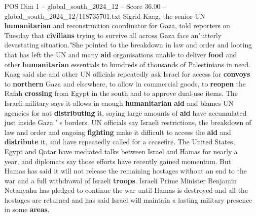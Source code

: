 \begin{textsample}{POS Dim 1 – global\_south\_2024\_12 – Score 36.00 – global\_south\_2024\_12/118735701.txt}
Sigrid Kaag, the senior UN \textbf{humanitarian} and reconstruction coordinator for Gaza, told reporters on Tuesday that \textbf{civilians} trying to survive all across Gaza face an"utterly devastating situation."She pointed to the breakdown in law and order and looting that has left the UN and many \textbf{aid} organisations unable to deliver \textbf{food} and other \textbf{humanitarian} essentials to hundreds of thousands of Palestinians in need.
Kaag said she and other UN officials repeatedly ask Israel for access for \textbf{convoys} to \textbf{northern} Gaza and elsewhere, to allow in commercial goods, to \textbf{reopen} the Rafah \textbf{crossing} from Egypt in the south and to approve dual-use items.
The Israeli military says it allows in enough \textbf{humanitarian} \textbf{aid} and blames UN agencies for not \textbf{distributing} it, saying large amounts of \textbf{aid} have accumulated just inside Gaza ' s borders.
UN officials say Israeli restrictions, the breakdown of law and order and ongoing \textbf{fighting} make it difficult to access the \textbf{aid} and \textbf{distribute} it, and have repeatedly called for a ceasefire.
The United States, Egypt and Qatar have mediated talks between Israel and Hamas for nearly a year, and diplomats say those efforts have recently gained momentum.
But Hamas has said it will not release the remaining hostages without an end to the war and a full withdrawal of Israeli \textbf{troops}.
Israeli Prime Minister Benjamin Netanyahu has pledged to continue the war until Hamas is destroyed and all the hostages are returned and has said Israel will maintain a lasting military presence in some \textbf{areas}.

\end{textsample}
